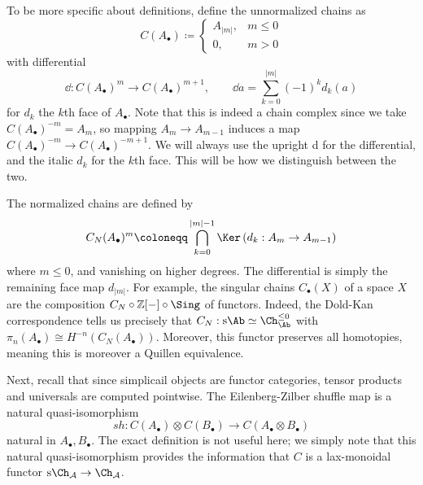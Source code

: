 To be more specific about definitions, define the unnormalized chains as
\[
	C(A_{\bullet} ) \coloneqq 
	\begin{cases}
		A_{\left| m \right| } ,& m \leq 0\\
		0,& m>0
	\end{cases}
\]
with differential
\[
	\dd : C(A_{\bullet} )^m \to C(A_{\bullet} )^{m+1} ,\qquad \dd a=\sum_{k=0}^{\left| m \right| } (-1)^{k} d_k(a)
\]
for $d_k$ the $k$th face of $A_{\bullet} $. Note that this is indeed a chain complex since we take $C(A_{\bullet} )^{-m} =A_{m} $, so mapping $A_m \to A_{m-1} $ induces a map $C(A_{\bullet} )^{-m} \to C(A_{\bullet} )^{-m+1} $. We will always use the upright d for the differential, and the italic $d_k$ for the $k$th face. This will be how we distinguish between the two.

The normalized chains are defined by
\[
	C_N(A_{\bullet} )^m \coloneqq \bigcap_{k=0} ^{\left| m \right| -1} \Ker \left( d_k : A_m \to A_{m-1}  \right) 
\]
where $m\leq 0$, and vanishing on higher degrees. The differential is simply the remaining face map $d_{\left| m \right| } $. For example, the singular chains $C_{\bullet} (X)$ of a space $X$ are the composition $C_N \circ \mathbb{Z} [-]\circ \Sing $ of functors. Indeed, the Dold-Kan correspondence tells us precisely that $C_N : \mathrm{s} \Ab \simeq \Ch_{\Ab } ^{\leq 0} $ with $\pi _n(A_{\bullet} )\cong H^{-n} (C_N(A_{\bullet} ))$. Moreover, this functor preserves all homotopies, meaning this is moreover a Quillen equivalence.

Next, recall that since simplicail objects are functor categories, tensor products and universals are computed pointwise. The Eilenberg-Zilber shuffle map is a natural quasi-isomorphism
\[
	sh : C(A_{\bullet} )\otimes C(B_{\bullet} )\to C(A_{\bullet} \otimes B_{\bullet} )
\]
natural in $A_{\bullet} ,B_{\bullet} $. The exact definition is not useful here; we simply note that this natural quasi-isomorphism provides the information that $C$ is a lax-monoidal functor $\mathrm{s} \Ch_{\mathcal{A} } \to \Ch_{\mathcal{A} } $.

